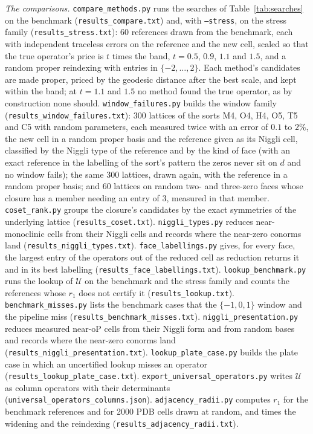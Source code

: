 \documentclass[preprint,pdf]{iucr}          %
\begin{document}
{\sloppy \emph{The comparisons.} \texttt{compare\_methods.py} runs the searches of Table~\ref{tab:searches} on the benchmark (\texttt{results\_compare.txt}) and, with \texttt{--stress}, on the stress family (\texttt{results\_stress.txt}): 60 references drawn from the benchmark, each with independent traceless errors on the reference and the new cell, scaled so that the true operator's price is $t$ times the band, $t=0.5$, $0.9$, $1.1$ and $1.5$, and a random proper reindexing with entries in $\{-2,\dots,2\}$. Each method's candidates are made proper, priced by the geodesic distance after the best scale, and kept within the band; at $t=1.1$ and $1.5$ no method found the true operator, as by construction none should. \texttt{window\_failures.py} builds the window family (\texttt{results\_window\_failures.txt}): 300 lattices of the sorts M4, O4, H4, O5, T5 and C5 with random parameters, each measured twice with an error of $0.1$ to $2\%$, the new cell in a random proper basis and the reference given as its Niggli cell, classified by the Niggli type of the reference and by the kind of face (with an exact reference in the labelling of the sort's pattern the zeros never sit on $d$ and no window fails); the same 300 lattices, drawn again, with the reference in a random proper basis; and 60 lattices on random two- and three-zero faces whose closure has a member needing an entry of $3$, measured in that member. \texttt{coset\_rank.py} groups the closure's candidates by the exact symmetries of the underlying lattice (\texttt{results\_coset.txt}). \texttt{niggli\_types.py} reduces near-monoclinic cells from their Niggli cells and records where the near-zero conorms land (\texttt{results\_niggli\_types.txt}). \texttt{face\_labellings.py} gives, for every face, the largest entry of the operators out of the reduced cell as reduction returns it and in its best labelling (\texttt{results\_face\_labellings.txt}). \texttt{lookup\_benchmark.py} runs the lookup of $\mathcal U$ on the benchmark and the stress family and counts the references whose $r_1$ does not certify it (\texttt{results\_lookup.txt}). \texttt{benchmark\_misses.py} lists the benchmark cases that the $\{-1,0,1\}$ window and the pipeline miss (\texttt{results\_benchmark\_misses.txt}). \texttt{niggli\_presentation.py} reduces measured near-oP cells from their Niggli form and from random bases and records where the near-zero conorms land (\texttt{results\_niggli\_presentation.txt}). \texttt{lookup\_plate\_case.py} builds the plate case in which an uncertified lookup misses an operator (\texttt{results\_lookup\_plate\_case.txt}). \texttt{export\_universal\_operators.py} writes $\mathcal U$ as column operators with their determinants (\texttt{universal\_operators\_columns.json}). \texttt{adjacency\_radii.py} computes $r_1$ for the benchmark references and for 2000 PDB cells drawn at random, and times the widening and the reindexing (\texttt{results\_adjacency\_radii.txt}).\par}
\end{document}
